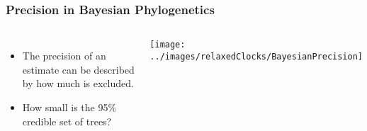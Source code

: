 \begin{frame}
\frametitle{Precision in Bayesian Phylogenetics}

\begin{columns}


\begin{itemize}
\item The precision of an estimate can be described by how much is excluded. 
\item How small is the 95\% credible set of trees?

\end{itemize}


\texttt{[image: ../images/relaxedClocks/BayesianPrecision]}

\end{columns}

\end{frame}